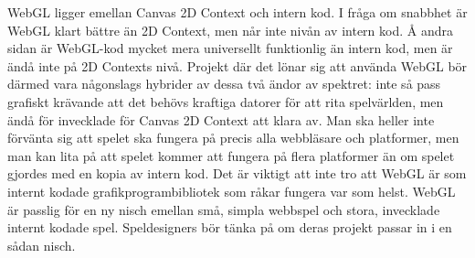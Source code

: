 WebGL ligger emellan Canvas 2D Context och intern kod. I fråga om snabbhet är WebGL klart bättre än 2D Context, men når inte nivån av intern kod. Å andra sidan är WebGL-kod mycket mera universellt funktionlig än intern kod, men är ändå inte på 2D Contexts nivå. Projekt där det lönar sig att använda WebGL bör därmed vara någonslags hybrider av dessa två ändor av spektret: inte så pass grafiskt krävande att det behövs kraftiga datorer för att rita spelvärlden, men ändå för invecklade för Canvas 2D Context att klara av. Man ska heller inte förvänta sig att spelet ska fungera på precis alla webbläsare och platformer, men man kan lita på att spelet kommer att fungera på flera platformer än om spelet gjordes med en kopia av intern kod. 
Det är viktigt att inte tro att WebGL är som internt kodade grafikprogrambibliotek som råkar fungera var som helst. WebGL är passlig för en ny nisch emellan små, simpla webbspel och stora, invecklade internt kodade spel. Speldesigners bör tänka på om deras projekt passar in i en sådan nisch.